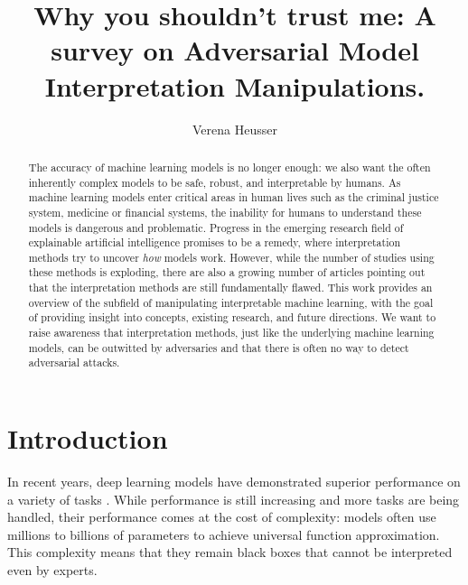 \documentclass[sigconf]{acmart}
\begin{document}
\title{Why you shouldn't trust me: A survey on Adversarial Model Interpretation Manipulations.}

\author{Verena Heusser}


\begin{abstract}
  The accuracy of machine learning models is no longer enough: we also want the often inherently complex models to be safe, robust, and interpretable by humans. As machine learning models enter critical areas in human lives such as the criminal justice system, medicine or financial systems, the inability for humans to understand these models is dangerous and problematic. Progress in the emerging research field of explainable artificial intelligence promises to be a remedy, where interpretation methods try to uncover \textit{how} models work. However, while the number of studies using these methods is exploding, there are also a growing number of articles pointing out that the interpretation methods are still fundamentally flawed.   
  This work provides an overview of the subfield of manipulating interpretable machine learning, with the goal of providing insight into concepts, existing research, and future directions. We want to raise awareness that interpretation methods, just like the underlying machine learning models, can be outwitted by adversaries and that there is often no way to detect adversarial attacks.
\end{abstract}




\maketitle

% 
\section{Introduction}
\label{sec:introduction}

In recent years, deep learning models have demonstrated superior performance on a variety of tasks \cite{ruede2020multi, brinker2019deep, nguyen2020super}. While performance is still increasing and more tasks are being handled, their performance comes at the cost of complexity: models often use millions to billions of parameters to achieve universal function approximation.
This complexity means that they remain black boxes that cannot be interpreted even by experts.
\end{document}
